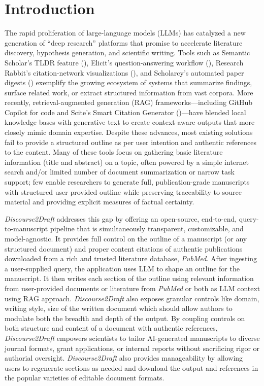 \documentclass[utf8]{FrontiersinHarvard} %
\newcommand{\appname}{\emph{Discourse2Draft}}
\begin{document}
\section{Introduction}

The rapid proliferation of large-language models (LLMs) has catalyzed a new generation of “deep research” platforms that promise to accelerate literature discovery, hypothesis generation, and scientific writing. Tools such as Semantic Scholar’s TLDR feature (\citep{Cachola2020TLDRES}), Elicit’s question-answering workflow (\citep{elicit2023}), Research Rabbit’s citation-network visualizations (\citep{researchrabbit2025}), and Scholarcy’s automated paper digests (\citep{scholarcy2026}) exemplify the growing ecosystem of systems that summarize findings, surface related work, or extract structured information from vast corpora. More recently, retrieval-augmented generation (RAG) frameworks—including GitHub Copilot for code and Scite’s Smart Citation Generator (\citep{nicholson2021scite})—have blended local knowledge bases with generative text to create context-aware outputs that more closely mimic domain expertise. Despite these advances, most existing solutions fail to provide a structured outline as per user intention and authentic references to the content. Many of these tools focus on gathering basic literature information (title and abstract) on a topic, often powered by a simple internet search and/or limited number of document summarization or narrow task support; few enable researchers to generate full, publication-grade manuscripts with structured user provided outline while preserving traceability to source material and providing explicit measures of factual certainty.

\appname{} addresses this gap by offering an open-source, end-to-end, query-to-manuscript pipeline that is simultaneously transparent, customizable, and model-agnostic. It provides full control on the outline of a manuscript (or any structured document) and proper content citations of authentic publications downloaded from a rich and trusted literature database, \emph{PubMed}. After ingesting a user-supplied query, the application uses LLM to shape an outline for the manuscript. It then writes each section of the outline using relevant information from user-provided documents or literature from \emph{PubMed} or both as LLM context using RAG approach. \appname{} also exposes granular controls like domain, writing style, size of the written document which should allow authors to modulate both the breadth and depth of the output. By coupling controls on both structure and content of a document with authentic references, \appname{} empowers scientists to tailor AI-generated manuscripts to diverse journal formats, grant applications, or internal reports without sacrificing rigor or authorial oversight. \appname{} also provides manageability by allowing users to regenerate sections as needed and download the output and references in the popular varieties of editable document formats.
\end{document}
